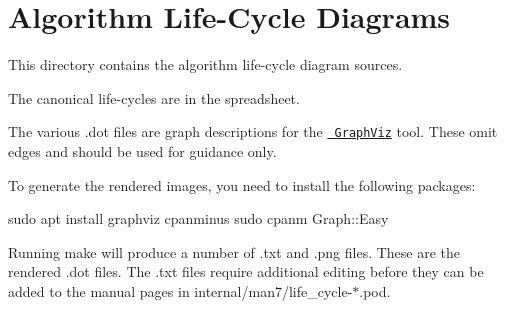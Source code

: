 \chapter{Algorithm Life-\/\+Cycle Diagrams}
\hypertarget{md__c_1_2_users_2namph_2_downloads_2openssl_2openssl-3_82_81_2doc_2life-cycles_2_r_e_a_d_m_e}{}\label{md__c_1_2_users_2namph_2_downloads_2openssl_2openssl-3_82_81_2doc_2life-cycles_2_r_e_a_d_m_e}
This directory contains the algorithm life-\/cycle diagram sources.

The canonical life-\/cycles are in the spreadsheet.

The various .dot files are graph descriptions for the \href{https://www.graphviz.org/}{\texttt{ Graph\+Viz}} tool. These omit edges and should be used for guidance only.

To generate the rendered images, you need to install the following packages\+: \begin{DoxyVerb}sudo apt install graphviz cpanminus
sudo cpanm Graph::Easy
\end{DoxyVerb}
 Running {\ttfamily make} will produce a number of {\ttfamily .txt} and {\ttfamily .png} files. These are the rendered {\ttfamily .dot} files. The {\ttfamily .txt} files require additional editing before they can be added to the manual pages in {\ttfamily internal/man7/life\+\_\+cycle-\/\texorpdfstring{$\ast$}{*}.pod}. 